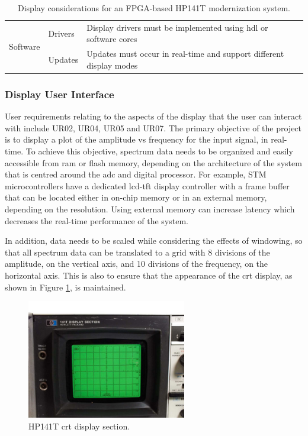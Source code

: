 \documentclass[class=report,11pt,crop=false]{standalone}
\begin{document}
\begin{table}[ht!]
\begin{tabular}{|m{8em}|m{10em}|m{22em}|}
			\multirow{2}{*}{Software} 
			& Drivers & Display drivers must be implemented using \acrshort{hdl} or software cores\\
			\cline{2-3}
			& Updates & Updates must occur in real-time and support different display modes \\
			\hline
		\end{tabular}
		\caption{Display considerations for an FPGA-based HP141T modernization system.}
		\label{tab:fpga-display-options}
	\end{table}
	
	\subsubsection{Display User Interface}

	User requirements relating to the aspects of the display that the user can interact with include UR02, UR04, UR05 and UR07. The primary objective of the project is to display a plot of the amplitude vs frequency for the input signal, in real-time. To achieve this objective, spectrum data needs to be organized and easily accessible from \acrshort{ram} or flash memory, depending on the architecture of the system that is centred around the \acrshort{adc} and digital processor. For example, STM microcontrollers have a dedicated \acrshort{lcd}-\acrshort{tft} display controller with a frame buffer that can be located either in on-chip memory or in an external memory, depending on the resolution. Using external memory can increase latency which decreases the real-time performance of the system. 
	
	In addition, data needs to be scaled while considering the effects of windowing, so that all spectrum data can be translated to a grid with 8 divisions of the amplitude, on the vertical axis, and 10 divisions of the frequency, on the horizontal axis. This is also to ensure that the appearance of the \acrshort{crt} display, as shown in Figure \ref{fig:display-section}, is maintained.
	 
	\begin{figure}[ht!]
		\centering
		\includegraphics[width=0.62\textwidth]{Figures/Methodology/HP-Display-Section}
		\caption{HP141T \acrshort{crt} display section.}
		\label{fig:display-section}
	\end{figure}
	
\end{document}
